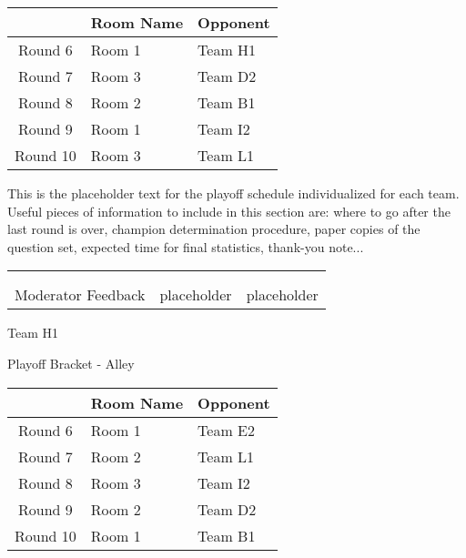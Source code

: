 \documentclass{article}%
\begin{document}
\vspace*{4pt}%
%
\begin{tabularx}{\textwidth}{|c|Y|Y|}%
\hline%
&Room Name&Opponent\\%
\hline%
Round 6&Room 1&Team H1\\%
Round 7&Room 3&Team D2\\%
Round 8&Room 2&Team B1\\%
Round 9&Room 1&Team I2\\%
Round 10&Room 3&Team L1\\%
\hline%
\end{tabularx}%
\vspace*{30pt}%
\linebreak%
This is the placeholder text for the playoff schedule individualized for each team. Useful pieces of information to include in this section are: where to go after the last round is over, champion determination procedure, paper copies of the question set, expected time for final statistics, thank{-}you note...%
\vspace*{30pt}%
\newline%
%
\begin{tabularx}{\textwidth}{YYY}%
  &  &  \\%
\\%
Moderator Feedback&placeholder&placeholder\\%
\end{tabularx}%
\newpage%
\begin{center}%
\begin{Huge}%
Team H1%
\end{Huge}%
\vspace*{12pt}%
\linebreak%
\begin{Large}%
Playoff Bracket {-} Alley%
\end{Large}%
\end{center}%
\vspace*{4pt}%
%
\begin{tabularx}{\textwidth}{|c|Y|Y|}%
\hline%
&Room Name&Opponent\\%
\hline%
Round 6&Room 1&Team E2\\%
Round 7&Room 2&Team L1\\%
Round 8&Room 3&Team I2\\%
Round 9&Room 2&Team D2\\%
Round 10&Room 1&Team B1\\%
\hline%
\end{tabularx}%
\end{document}
